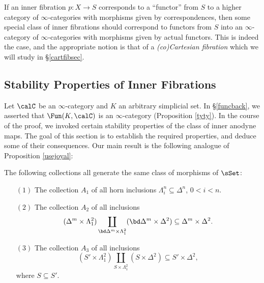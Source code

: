 If an inner fibration $p: X \rightarrow S$ corresponds to a ``functor'' from $S$ to a higher category of $\infty$-categories with morphisms given by correspondences, then some special class of inner fibrations should correspond to functors from $S$ into an $\infty$-category of $\infty$-categories with morphisms given by actual functors. This is indeed the case, and the appropriate notion is that of a {\em (co)Cartesian fibration} which we will study in \S \ref{cartfibsec}.

\subsection{Stability Properties of Inner Fibrations}\label{joyalpr}

Let $\calC$ be an $\infty$-category and $K$ an arbitrary simplicial set. In \S \ref{funcback}, we asserted that $\Fun(K,\calC)$ is an $\infty$-category (Proposition \ref{tyty}). In the course of the proof, we invoked certain stability properties of the class of inner anodyne maps. The goal of this section is to establish the required properties, and deduce some of their consequences.
Our main result is the following analogue of Proposition \ref{usejoyal}:

\begin{proposition}\label{usejoyal2}
The following collections all generate the same class of morphisms
of $\sSet$:
\begin{itemize}
\item[$(1)$] The collection $A_1$ of all horn inclusions $\Lambda^n_i
\subseteq \Delta^n$, $0 < i < n$.

\item[$(2)$] The collection $A_2$ of all inclusions $$(\Delta^m \times
\Lambda^2_1) \coprod_{ \bd \Delta^m \times \Lambda^2_1 } (\bd
\Delta^m \times \Delta^2) \subseteq \Delta^m \times \Delta^2.$$

\item[$(3)$] The collection $A_3$ of all inclusions $$(S' \times
\Lambda^2_1) \coprod_{S \times \Lambda^2_1 } (S \times \Delta^2)
\subseteq S' \times \Delta^2,$$ where $S \subseteq S'$.

\end{itemize}
\end{proposition}

